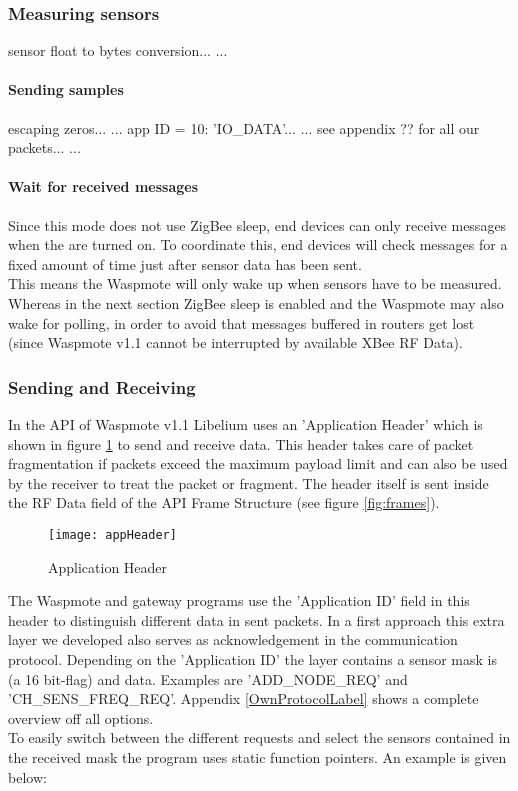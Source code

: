 \subsubsection{Measuring sensors}
sensor float to bytes conversion... ...
\paragraph{Sending samples}
escaping zeros... ...
app ID = 10: 'IO\_DATA'... ...
see appendix ?? for all our packets... ...
\paragraph{Wait for received messages}
Since this mode does not use ZigBee sleep, end devices can only receive messages when the are turned on. To coordinate this, end devices will check messages for a fixed amount of time just after sensor data has been sent.\\
This means the Waspmote will only wake up when sensors have to be measured. Whereas in the next section ZigBee sleep is enabled and the Waspmote may also wake for polling, in order to avoid that messages buffered in routers get lost (since Waspmote v1.1 cannot be interrupted by available XBee RF Data). 


\subsubsection{Sending and Receiving}
\label{frames1}
In the API of Waspmote v1.1 Libelium uses an 'Application Header' which is shown in figure \ref{fig:appH} to send and receive data. This header takes care of packet fragmentation if packets exceed the maximum payload limit and can also be used by the receiver to treat the packet or fragment. The header itself is sent inside the RF Data field of the API Frame Structure (see figure \ref{fig:frames}).\\
\begin{figure}[ht]
\centering
\texttt{[image: appHeader]}
\caption{Application Header}
\label{fig:appH}
\end{figure}
The Waspmote and gateway programs use the 'Application ID' field in this header to distinguish different data in sent packets. In a first approach this extra layer we developed also serves as acknowledgement in the communication protocol. Depending on the 'Application ID' the layer contains a sensor mask is (a 16 bit-flag) and data. Examples are 'ADD\_NODE\_REQ' and 'CH\_SENS\_FREQ\_REQ'. Appendix \ref{OwnProtocolLabel} shows a complete overview off all options.\\
To easily switch between the different requests and select the sensors contained in the received mask the program uses static function pointers. An example is given below:


